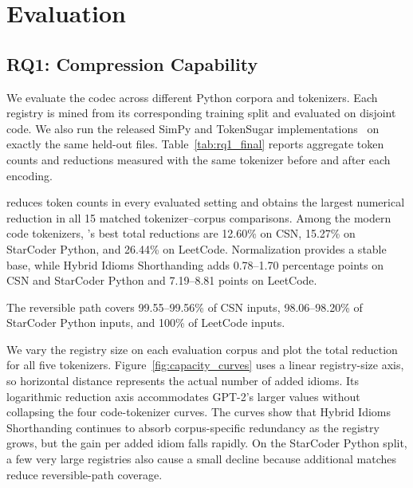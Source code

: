 
\section{Evaluation}

\subsection{RQ1: Compression Capability}
\label{subsec:rq1_results}

We evaluate the codec across different Python corpora and tokenizers. Each \tool registry is mined from its corresponding training split and evaluated on disjoint code. We also run the released SimPy and TokenSugar implementations~\cite{simpy2024,tokensugar2024} on exactly the same held-out files. Table~\ref{tab:rq1_final} reports aggregate token counts and reductions measured with the same tokenizer before and after each encoding.



\tool reduces token counts in every evaluated setting and obtains the largest numerical reduction in all 15 matched tokenizer--corpus comparisons. Among the modern code tokenizers, \tool's best total reductions are 12.60\% on CSN, 15.27\% on StarCoder Python, and 26.44\% on LeetCode. Normalization provides a stable base, while Hybrid Idioms Shorthanding adds 0.78--1.70 percentage points on CSN and StarCoder Python and 7.19--8.81 points on LeetCode.

The reversible path covers 99.55--99.56\% of CSN inputs, 98.06--98.20\% of StarCoder Python inputs, and 100\% of LeetCode inputs.

We vary the registry size on each evaluation corpus and plot the total reduction for all five tokenizers. Figure~\ref{fig:capacity_curves} uses a linear registry-size axis, so horizontal distance represents the actual number of added idioms. Its logarithmic reduction axis accommodates GPT-2's larger values without collapsing the four code-tokenizer curves. The curves show that Hybrid Idioms Shorthanding continues to absorb corpus-specific redundancy as the registry grows, but the gain per added idiom falls rapidly. On the StarCoder Python split, a few very large registries also cause a small decline because additional matches reduce reversible-path coverage.

